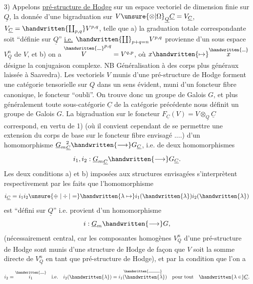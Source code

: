 3) Appelons \uline{pré-structure de Hodge} sur un espace vectoriel  de dimension finie sur $\underline{Q}$, la donnée d'une bigraduation sur $V\unsure{\otimes|\Omega}_{\underline{Q}}\underline{C}=V_{\underline{C}}$, $V_{\underline{C}}=\handwritten{\coprod_{p,q}}V^{p,q}$, telle que a) la graduation totale correspondante soit ``définie sur $\underline{Q}$'' \uline{i.e.} $\handwritten{\coprod}_{p+q=n}V^{p,q}$ provienne d'un sous espace $V_{\underline{Q}}^n$ de $V$, et b) on a $\overset{\handwritten{\rule{.65em}{.35pt}}}{V}^{p,q}=V^{q,p}$, où $x\handwritten{\mapsto}\overset{\handwritten{\rule{.55em}{.35pt}}}{x}$ désigne la conjugaison complexe. \unsure{(}NB Généralisation à des corps plus généraux laissée à Saavedra). Les vectoriels $V$ munis d'une pré-structure de Hodge forment une catégorie tensorielle sur $\underline{Q}$ dans un sens évident, muni d'un foncteur fibre canonique, le foncteur ``oubli''. On trouve donc un groupe de Galois $G$, et  plus généralement toute \inserted{$\otimes$-}sous-catégorie $\underline{C}$ de la catégorie précédente nous définit un groupe de Galois $G$. La bigraduation sur le foncteur  $F_{\underline{C}}(V)=V\otimes_{\underline{Q}}\underline{C}$ correspond, en vertu de 1) (où il convient cependant de se permettre une extension du corps de base sur le foncteur fibre envisagé ....) d'un homomorphisme ${\underline{G}_m}_{\underline{C}}^2\handwritten{\longrightarrow}G_{\underline{C}}$, i.e. de deux homomorphismes 
\[
i_1,i_2:{\underline{G}_m}_{\underline{C}}\handwritten{\longrightarrow}G_{\underline{C}}.
\]
Les deux conditions a) et b) imposées aux structures envisagées s'interprètent respectivement par les faits que l'homomorphisme
\[
i_{\underline{C}}=i_1i_2\unsure{\doteqdot|\div|=}\handwritten{\lambda\mapsto}i_1(\handwritten{\lambda})i_2(\handwritten{\lambda})
\]
est ``défini sur $\underline{Q}$'' i.e. provient d'un homomorphisme
\[
i:\underline{G}_m\handwritten{\longrightarrow}G,
\]
(nécessairement central, car les composantes homogènes $V_{\underline{Q}}^n$ d'une pré-structure de Hodge sont  munis d'une structure de Hodge de façon que $V$ soit la somme directe de $V_{\underline{Q}}^n$ en tant que pré-structure
%
de Hodge), et par la condition que l'on a
\[
i_2=\overset{\handwritten{\rule{0.8em}{0.4pt}}}{i_1}\quad\text{i.e.}\quad i_2(\handwritten{\lambda})=\overset{\handwritten{\rule{2.2em}{0.4pt}}}{i_1(\handwritten{\bar{\lambda}})}\quad\text{pour tout}\quad\handwritten{\lambda\in}\underline{C}.
\]

